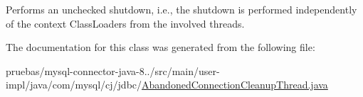 Performs an unchecked shutdown, i.\+e., the shutdown is performed independently of the context Class\+Loaders from the involved threads. 

The documentation for this class was generated from the following file\+:\begin{DoxyCompactItemize}
\item 
pruebas/mysql-\/connector-\/java-\/8../src/main/user-\/impl/java/com/mysql/cj/jdbc/\mbox{\hyperlink{_abandoned_connection_cleanup_thread_8java}{Abandoned\+Connection\+Cleanup\+Thread.\+java}}\end{DoxyCompactItemize}
